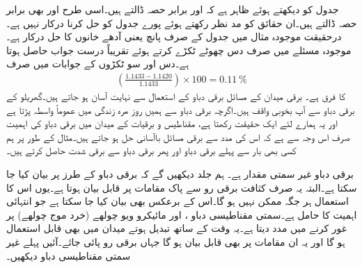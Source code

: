 جدول کو دیکھتے ہوئے ظاہر ہے کہ  اور  برابر حصہ ڈالتے ہیں۔اسی طرح  اور  بھی برابر حصہ ڈالتے ہیں۔ان حقائق کو مد نظر رکھتے ہوئے پورے جدول کو حل کرنا درکار نہیں ہے۔درحقیقت موجودہ مثال میں جدول کے صرف پانچ یعنی آدھے خانوں  کا حل درکار ہے۔موجودہ مسئلے میں صرف دس چھوٹے ٹکڑے کرتے ہوئے تقریباً درست جواب حاصل ہوتا ہے۔دس اور سو ٹکڑوں کے جوابات میں صرف
\begin{align*}
\left(\frac{1.1433-1.1420}{1.1433}\right)\times 100=\SI{0.11}{\percent} 
\end{align*}
کا فرق ہے۔
برقی میدان کے مسائل برقی دباو کے استعمال سے نہایت آسان ہو جاتے ہیں۔گھریلو  کے برقی دباو سے آپ بخوبی واقف ہیں۔اگرچہ برقی دباو سے ہمیں روز مرہ زندگی میں عموماً واسطہ پڑتا ہے اور یہ ہمارے لئے ایک حقیقت رکھتا ہے، مقناطیس و برقیات کے میدان میں برقی دباو کی اہمیت صرف اس وجہ سے ہے کہ اس کی مدد سے برقی مسائل باآسانی حل ہو جاتے ہیں۔مثال کے طور پر ہم کسی بھی بار سے پہلے برقی دباو اور پھر برقی دباو سے برقی شدت حاصل کرتے ہیں۔

برقی دباو غیر سمتی مقدار ہے۔ ہم جلد دیکھیں گے کہ برقی دباو کے طرز پر  بیان کیا جا سکتا ہے۔البتہ یہ صرف کثافت برقی رو سے پاک مقامات پر قابل بیان ہوتا ہے۔یوں اس کا استعمال ہر جگہ ممکن نہیں ہو گا۔اس کے برعکس  بھی بیان کیا جا سکتا ہے جو انتہائی اہمیت کا حامل ہے۔سمتی مقناطیسی دباو ،  اور مائیکرو ویو چولھے (خرد موج چولھے) پر غور کرنے میں مدد دیتا ہے۔یہ وقت کے ساتھ تبدیل ہوتے میدان میں بھی قابل استعمال ہو گا اور یہ ان مقامات پر بھی قابل بیان ہو گا جہاں برقی رو پائی جائے۔آئیں پہلے غیر سمتی مقناطیسی دباو دیکھیں۔

